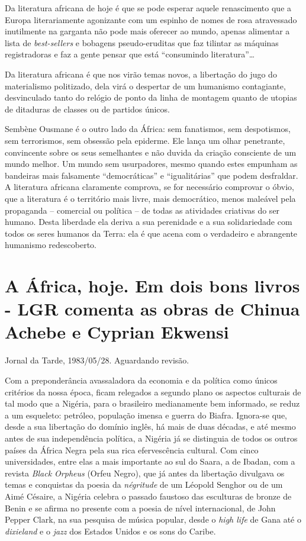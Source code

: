 \documentclass[
  letterpaper,
  DIV=11,
  numbers=noendperiod]{scrreprt}
\begin{document}
Da literatura africana de hoje é que se pode esperar aquele renascimento
que a Europa literariamente agonizante com um espinho de nomes de rosa
atravessado inutilmente na garganta não pode mais oferecer ao mundo,
apenas alimentar a lista de \emph{best-sellers} e bobagens
pseudo-eruditas que faz tilintar as máquinas registradoras e faz a gente
pensar que está ``consumindo literatura''\ldots{}

Da literatura africana é que nos virão temas novos, a libertação do jugo
do materialismo politizado, dela virá o despertar de um humanismo
contagiante, desvinculado tanto do relógio de ponto da linha de montagem
quanto de utopias de ditaduras de classes ou de partidos únicos.

Sembène Ousmane é o outro lado da África: sem fanatismos, sem
despotismos, sem terrorismos, sem obsessão pela epiderme. Ele lança um
olhar penetrante, convincente sobre os seus semelhantes e não duvida da
criação consciente de um mundo melhor. Um mundo sem usurpadores, mesmo
quando estes empunham as bandeiras mais falsamente ``democráticas'' e
``igualitárias'' que podem desfraldar. A literatura africana claramente
comprova, se for necessário comprovar o óbvio, que a literatura é o
território mais livre, mais democrático, menos maleável pela propaganda
-- comercial ou política -- de todas as atividades criativas do ser
humano. Desta liberdade ela deriva a sua perenidade e a sua
solidariedade com todos os seres humanos da Terra: ela é que acena com o
verdadeiro e abrangente humanismo redescoberto.

\chapter{A África, hoje. Em dois bons livros - LGR comenta as obras de
Chinua Achebe e Cyprian
Ekwensi}\label{a-uxe1frica-hoje.-em-dois-bons-livros---lgr-comenta-as-obras-de-chinua-achebe-e-cyprian-ekwensi}

Jornal da Tarde, 1983/05/28. Aguardando revisão.

\hfill\break

Com a preponderância avassaladora da economia e da política como únicos
critérios da nossa época, ficam relegados a segundo plano os aspectos
culturais de tal modo que a Nigéria, para o brasileiro medianamente bem
informado, se reduz a um esqueleto: petróleo, população imensa e guerra
do Biafra. Ignora-se que, desde a sua libertação do domínio inglês, há
mais de duas décadas, e até mesmo antes de sua independência política, a
Nigéria já se distinguia de todos os outros países da África Negra pela
sua rica efervescência cultural. Com cinco universidades, entre elas a
mais importante ao sul do Saara, a de Ibadan, com a revista \emph{Black
Orpheus} (Orfeu Negro), que já antes da libertação divulgava os temas e
conquistas da poesia da \emph{négritude} de um Léopold Senghor ou de um
Aimé Césaire, a Nigéria celebra o passado faustoso das esculturas de
bronze de Benin e se afirma no presente com a poesia de nível
internacional, de John Pepper Clark, na sua pesquisa de música popular,
desde o \emph{high life} de Gana até o \emph{dixieland} e o \emph{jazz}
dos Estados Unidos e os sons do Caribe.
\end{document}
